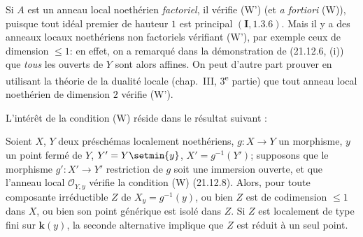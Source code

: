 \begin{examples}[21.12.9]
\label{IV.21.12.9}
Si $A$ est un anneau local noethérien \emph{factoriel}, il vérifie (W') (et
\emph{a fortiori} (W)), puisque tout idéal premier de hauteur $1$ est principal
$(\mathbf I, 1.3.6)$. Mais il y a des anneaux locaux noethériens non factoriels
vérifiant (W'), par exemple ceux de dimension $\leq1$: en effet, on a remarqué dans la
démonstration de (21.12.6, (i)) que \emph{tous} les ouverts de $Y$ sont alors affines.
On peut d'autre part prouver en utilisant la théorie de la dualité locale (chap.~III,
3\textsuperscript{e} partie) que tout anneau local noethérien de dimension $2$ vérifie
(W').
\end{examples}

L'intérêt de la condition (W) réside dans le résultat suivant :

\begin{proposition}[21.12.10]
\label{IV.21.12.10}
Soient $X$, $Y$ deux préschémas localement noethériens, $g:X\to Y$ un morphisme,
$y$ un point fermé de $Y$, $Y'=Y\setmin\{y\}$, $X'=g^{-1}(Y')$; supposons que le morphisme
$g':X'\to Y'$ restriction de $g$ soit une immersion ouverte, et que l'anneau local
$\mathcal O_{Y,y}$ vérifie la condition \textup{(W) (21.12.8)}. Alors, pour toute composante
irréductible $Z$ de $X_y=g^{-1}(y)$, \textup{ou bien} $Z$ est de codimension $\leq1$ dans $X$,
\textup{ou bien} son point générique est isolé dans $Z$. Si $Z$ est localement de type fini sur
$\boldsymbol{k}(y)$, la seconde alternative implique que $Z$ est réduit à un seul point.
\end{proposition}

